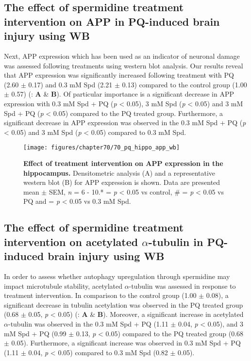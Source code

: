 \subsection{The effect of spermidine treatment intervention on APP in PQ-induced brain injury using WB}
Next, APP expression which has been used as an indicator of neuronal damage was assessed following treatments using western blot analysis. Our results reveal that APP expression was significantly increased following treatment with PQ (2.60 $\pm$ 0.17) and 0.3 mM Spd (2.21 $\pm$ 0.13) compared to the control group (1.00 $\pm$ 0.57) (: \textbf{A} \& \textbf{B}). Of particular importance is a significant decrease in APP expression with 0.3 mM Spd + PQ (\textit{p} < 0.05), 3 mM Spd (\textit{p} < 0.05) and 3 mM Spd + PQ (\textit{p} < 0.05) compared to the PQ treated group. Furthermore, a significant decrease in APP expression was observed in the 0.3 mM Spd + PQ (\textit{p} < 0.05) and 3 mM Spd (\textit{p} < 0.05) compared to 0.3 mM Spd. 

\begin{figure}[!htbp]
\center
  \texttt{[image: figures/chapter70/70\_pq\_hippo\_app\_wb]}
  \caption[Effect of treatment intervention on APP expression in the hippocampus]{\textbf{Effect of treatment intervention on APP expression in the hippocampus.} Densitometric analysis (A) and a representative western blot (B) for APP expression is shown. Data are presented  mean $\pm$ SEM, \textit{n} = 6 - 10.* = \textit{p} < 0.05 vs control, \# = \textit{p} < 0.05 vs PQ and \@ = \textit{p} < 0.05 vs 0.3 mM Spd.}
  \label{fig:70_pq_hippo_app_wb}
\end{figure} 

\subsection{The effect of spermidine treatment intervention on acetylated $\alpha$-tubulin in PQ-induced brain injury using WB}
In order to assess whether autophagy upregulation through spermidine may impact microtubule stability, acetylated $\alpha$-tubulin was assessed in response to treatment intervention. In comparison to the control group (1.00 $\pm$ 0.08), a significant decrease in tubulin acetylation was observed in the PQ treated group (0.68 $\pm$ 0.05, \textit{p} < 0.05) (: \textbf{A} \& \textbf{B}). Moreover, a significant increase in acetylated $\alpha$-tubulin was observed in the 0.3 mM Spd + PQ (1.11 $\pm$ 0.04, \textit{p} < 0.05), and 3 mM Spd + PQ (0.99 $\pm$ 0.13, \textit{p} < 0.05) compared to the PQ treated group (0.68 $\pm$ 0.05). Furthermore, a significant increase was observed in 0.3 mM Spd + PQ (1.11 $\pm$ 0.04, \textit{p} < 0.05) compared to 0.3 mM Spd (0.82 $\pm$ 0.05).

